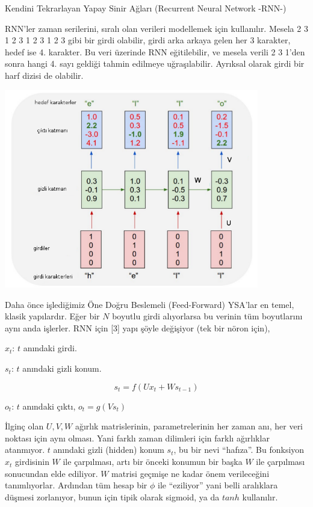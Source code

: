 \documentclass[12pt,fleqn]{article}\usepackage{../../common}
\begin{document}
Kendini Tekrarlayan Yapay Sinir Ağları (Recurrent Neural Network -RNN-)

RNN'ler zaman serilerini, sıralı olan verileri modellemek için
kullanılır. Mesela 2 3 1 2 3 1 2 3 1 2 3 gibi bir girdi olabilir, girdi
arka arkaya gelen her 3 karakter, hedef ise 4. karakter. Bu veri üzerinde
RNN eğitilebilir, ve mesela verili 2 3 1'den sonra hangi 4. sayı geldiği
tahmin edilmeye uğraşılabilir. Ayrıksal olarak girdi bir harf dizisi de
olabilir. 

\includegraphics[width=30em]{rnn_01.png}

Daha önce işlediğimiz Öne Doğru Beslemeli (Feed-Forward) YSA'lar en temel,
klasik yapılardır. Eğer bir $N$ boyutlu girdi alıyorlarsa bu verinin tüm
boyutlarını aynı anda işlerler. RNN için [3] yapı şöyle değişiyor (tek bir
nöron için),

$x_t$: $t$ anındaki girdi. 

$s_t$: $t$ anındaki gizli konum. 

$$ s_t = f(U x_t +  W s_{t-1})$$

$o_t$: $t$ anındaki çıktı, $o_t = g(V s_t)$

İlginç olan $U,V,W$ ağırlık matrislerinin, parametrelerinin her zaman anı,
her veri noktası için aynı olması. Yani farklı zaman dilimleri için farklı
ağırlıklar atanmıyor. $t$ anındaki gizli (hidden) konum $s_t$, bu bir nevi
``hafıza''. Bu fonksiyon $x_t$ girdisinin $W$ ile çarpılması, artı bir
önceki konumun bir başka $W$ ile çarpılması sonucundan elde ediliyor. $W$
matrisi geçmişe ne kadar önem verileceğini tanımlıyorlar. Ardından tüm
hesap bir $\phi$ ile ``eziliyor'' yani belli aralıklara düşmesi zorlanıyor,
bunun için tipik olarak sigmoid, ya da $tanh$ kullanılır.
\end{document}
